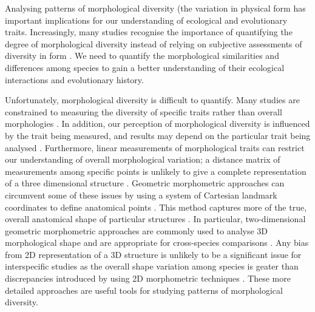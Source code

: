 \documentclass[12pt,a4paper]{article}
\begin{document}
	Analysing patterns of morphological diversity (the variation in physical form \citep{Foote1997} has important implications for our understanding of ecological and evolutionary traits. Increasingly, many studies recognise the importance of quantifying the degree of morphological diversity instead of relying on subjective assessments of diversity in form \citep[e.g.][]{Ruta2013,Hopkins2013, Goswami2011,Drake2010, Price2010, Brusatte2008}. We need to quantify the morphological similarities and differences among species to gain a better understanding of their ecological interactions and evolutionary history. 
	
	Unfortunately, morphological diversity is difficult to quantify. Many studies are constrained to measuring the diversity of specific traits rather than overall morphologies \citep{Roy1997}. In addition, our perception of morphological diversity is influenced by the trait being measured, and results may depend on the particular trait being analysed \citep{Foth2012}. Furthermore, linear measurements of morphological traits can restrict our understanding of overall morphological variation; a distance matrix of measurements among specific points is unlikely to give a complete representation of a three dimensional structure \citep{Rohlf1993}. Geometric morphometric approaches can circumvent some of these issues by using a system of Cartesian landmark coordinates to define anatomical points \citep[][and references therein]{Adams2004}. This method captures more of the true, overall anatomical shape of particular structures \citep{Mitteroecker2009}. In particular, two-dimensional geometric morphometric approaches are commonly used to analyse 3D morphological shape and are appropriate for cross-species comparisons \citep[e.g.][]{Muschick2012, Panchetti2008, Wroe2007}. Any bias from 2D representation of a 3D structure is unlikely to be a significant issue for interspecific studies as the overall shape variation among species is geater than discrepancies introduced by using 2D morphometric techniques \citep{Cardini2014}. These more detailed approaches are useful tools for studying patterns of morphological diversity.
	
\end{document}
